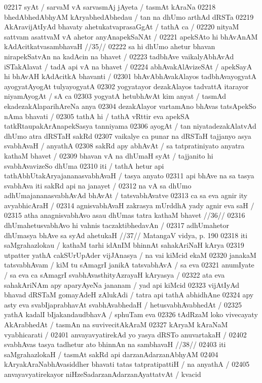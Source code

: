 02217 syAt / sarvaM vA sarvasmAj jAyeta / tasmAt kAraNa
02218 bhedAbhedAbhyAM kAryabhedAbhedau / tan na dhUmo arthAd dRSTa
02219 AkAravijAtIyAd bhavaty ahetukatvaprasaGgAt / tathA ca / 
02220 	nityaM sattvam asattvaM vA ahetor anyAnapekSaNAt /
02221 	apekSAto hi bhAvAnAM kAdAcitkatvasambhavaH //35// 
02222 sa hi dhUmo ahetur bhavan nirapekSatvAn na kadAcin na bhavet /
02223 tadbhAve vaikalyAbhAvAd iSTakAlavat / tadA api vA na bhavet /  
02224 abhAvakAlAvizeSAt / apekSayA hi bhAvAH kAdAcitkA bhavanti /
02301 bhAvAbhAvakAlayos tadbhAvayogyatA ayogyatAyogAt tulyayogyatA
02302 yogyatayor dezakAlayos tadvattA itarayor niyamAyogAt / sA ca 
02303 yogyatA hetubhAvAt kim anyat / tasmAd ekadezakAlaparihAreNa anya
02304 dezakAlayor vartamAno bhAvas tatsApekSo nAma bhavati / 
02305 tathA hi / tathA vRttir eva apekSA tatkRtaupakArAnapekSasya tanniyama
02306 ayogAt / tan niyatadezakAlatvAd dhUmo atra dRSTaH sakRd 
02307 vaikalye ca punar na dRSTaH tajjanyo asya svabhAvaH / anyathA 
02308 sakRd apy abhAvAt / sa tatpratiniyato anyatra kathaM bhavet / 
02309 bhavan vA na dhUmaH syAt / tajjanito hi svabhAvavizeSo dhUma 
02310 iti / tathA hetur api tathAbhUtakAryajananasvabhAvaH / tasya anyato
02311 api bhAve na sa tasya svabhAva iti sakRd api na janayet /
02312 na vA sa dhUmo adhUmajananasvabhAvAd bhAvAt / tatsvabhAvatve
02313 ca sa eva agnir ity avyabhicAraH /
02314 	agnisvabhAvaH zakrasya mUrddhA yady agnir eva saH / 
02315 	atha anagnisvabhAvo asau dhUmas tatra kathaM bhavet //36//  
02316 	dhUmahetusvabhAvo hi vahnis taczaktibhedavAn / 
02317 	adhUmahetor dhUmasya bhAve sa syAd ahetukaH //37//  
MatangaV vidya, p. 190
02318 iti saMgrahazlokau / kathaM tarhi idAnIM bhinnAt sahakAriNaH kArya  
02319 utpatter yathA cakSUrUpAder vijJAnasya / na vai kiMcid ekaM 
02320 janakaM tatsvabhAvam / kiM tu sAmagrI janikA tatsvabhAvA / sa eva 
02321 anumIyate / sa eva ca sAmagrI svabhAvasthityAzrayaH kAryasya / 
02322 ata eva sahakAriNAm apy aparyAyeNa jananam / yad api kiMcid
02323 vijAtIyAd bhavad dRSTaM gomayAdeH zAlukAdi / tatra api tathA abhidhAne
02324 apy asty eva svabIjaprabhavAt svabhAvabhedaH / hetusvabhAvabhedAt /
02325 yathA kadalI bIjakandaudbhavA / sphuTam eva 
02326 tAdRzaM loko vivecayaty AkArabhedAt / tasmAn na suvivecitAkAraM 
02327 kAryaM kAraNaM vyabhicarati / 
02401 	anvayavyatirekAd yo yasya dRSTo anuvartakaH / 
02402 	svabhAvas tasya tadhetur ato bhinnAn na sambhavaH //38// 
02403 iti saMgrahazlokaH / tasmAt sakRd api darzanAdarzanAbhyAM
02404 kAryakAraNabhAvasiddher bhavati tatas tatpratipattiH / na anyathA / 
02405 anvayavyatirekayor niHzeSadarzanAdarzanAyattatvAt / kvacid  
